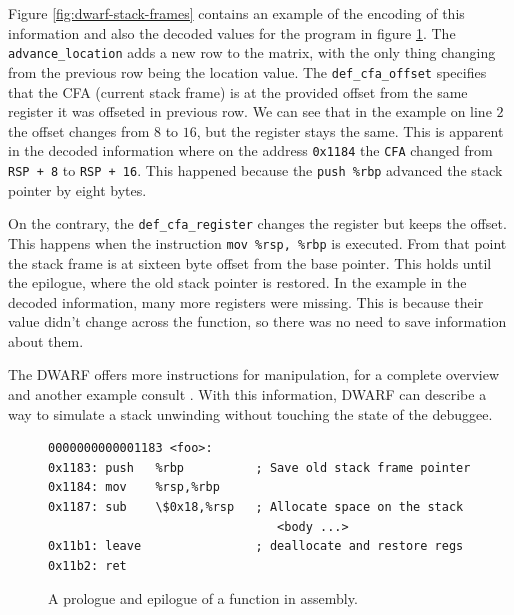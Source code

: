Figure \ref{fig:dwarf-stack-frames} contains an example of the encoding of this
information and also the decoded values for the program in figure
\ref{fig:prologue-and-epilogue}. The \texttt{advance\_location} adds a new row
to the matrix, with the only thing changing from the previous row being the
location value. The \texttt{def\_cfa\_offset} specifies that the CFA (current
stack frame) is at the provided offset from the same register it was offseted
in previous row. We can see that in the example on line $2$ the offset changes
from $8$ to $16$, but the register stays the same. This is apparent in the
decoded information where on the address \texttt{0x1184} the \texttt{CFA}
changed from \texttt{RSP + 8} to \texttt{RSP + 16}. This happened because
the \texttt{push \%rbp} advanced the stack pointer by eight bytes.

On the contrary, the \texttt{def\_cfa\_register} changes the register but keeps
the offset. This happens when the instruction \texttt{mov \%rsp, \%rbp} is
executed. From that point the stack frame is at sixteen byte offset from the
base pointer. This holds until the epilogue, where the old stack pointer is
restored. In the example in the decoded information, many more registers were
missing. This is because their value didn't change across the function, so
there was no need to save information about them.

The DWARF offers more instructions for manipulation, for a complete overview
and another example consult \cite{dwarf}. With this information, DWARF can
describe a way to simulate a stack unwinding without touching the state of the
debuggee.

\begin{figure}
    \begin{lstlisting}
0000000000001183 <foo>:
0x1183:	push   %rbp          ; Save old stack frame pointer
0x1184:	mov    %rsp,%rbp     
0x1187:	sub    \$0x18,%rsp   ; Allocate space on the stack
                                <body ...>
0x11b1:	leave                ; deallocate and restore regs
0x11b2:	ret
    \end{lstlisting}
    \caption{A prologue and epilogue of a function in assembly.}
    \label{fig:prologue-and-epilogue}
\end{figure}

